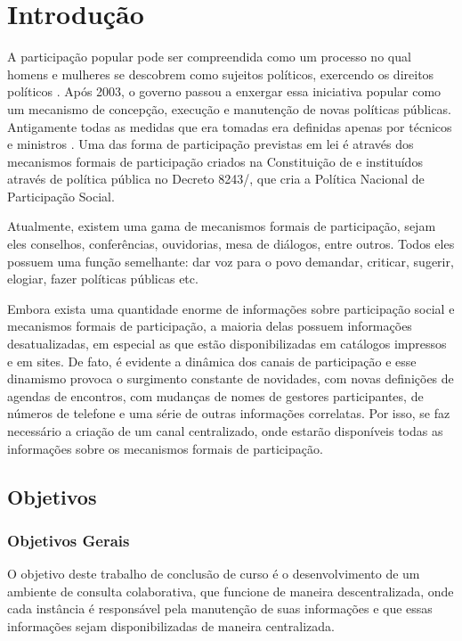 \chapter{Introdução}

A participação popular pode ser compreendida como um processo no qual homens e mulheres se descobrem como sujeitos políticos, exercendo os direitos políticos \cite{almeida2011participacao}. Após 2003, o governo passou a enxergar essa iniciativa popular como um mecanismo de concepção, execução e manutenção de novas políticas públicas. Antigamente todas as medidas que era tomadas era definidas apenas por técnicos e ministros \cite{sgpr2010conselhos}.
%
Uma das forma de participação previstas em lei é através dos mecanismos formais de participação criados na Constituição de \citeyear{cf} e instituídos através de política pública no Decreto 8243/\citeyear{decreto8243}, que cria a Política Nacional de Participação Social.

Atualmente, existem uma gama de mecanismos formais de participação, sejam eles conselhos, conferências, ouvidorias, mesa de diálogos, entre outros. Todos eles possuem uma função semelhante: dar voz para o povo demandar, criticar, sugerir, elogiar, fazer políticas públicas etc. 

Embora exista uma quantidade enorme de informações sobre participação social e mecanismos formais de participação, a maioria delas possuem informações desatualizadas, em especial as que estão disponibilizadas em catálogos impressos e em sites.
%
De fato, é evidente a dinâmica dos canais de participação e esse dinamismo provoca o surgimento constante de novidades, com novas definições de agendas de encontros, com mudanças de nomes de gestores participantes, de números de telefone e uma série de outras informações correlatas. Por isso, se faz necessário a criação de um canal centralizado, onde estarão disponíveis todas as informações sobre os mecanismos formais de participação.

\section{Objetivos}

\subsection{Objetivos Gerais}

O objetivo deste trabalho de conclusão de curso é o desenvolvimento de um ambiente de consulta colaborativa, que funcione de maneira descentralizada, onde cada instância é responsável pela manutenção de suas informações e que essas informações sejam disponibilizadas de maneira centralizada. 

